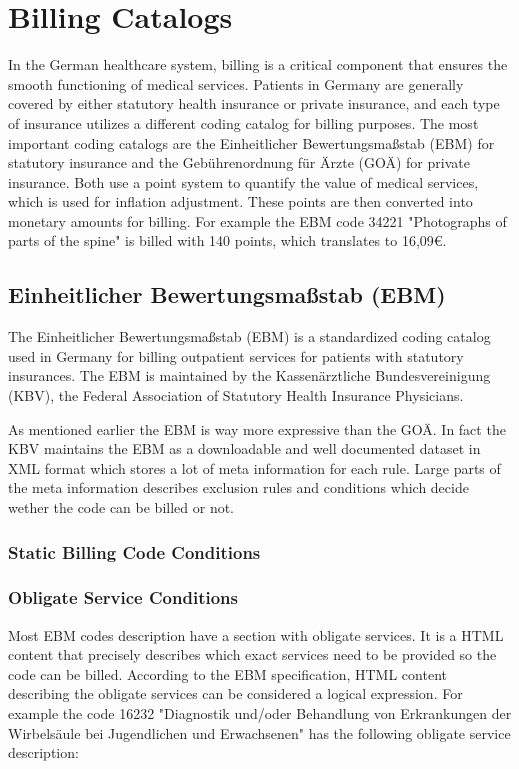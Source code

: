 \section{Billing Catalogs}
In the German healthcare system, billing is a critical component that ensures the smooth functioning of medical services.
Patients in Germany are generally covered by either statutory health insurance or private insurance, and each type of insurance
utilizes a different coding catalog for billing purposes.
The most important coding catalogs are the Einheitlicher Bewertungsmaßstab (EBM) for statutory insurance and the Gebührenordnung für Ärzte (GOÄ) for private insurance.
Both use a point system to quantify the value of medical services, which is used for inflation adjustment.
These points are then converted into monetary amounts for billing.
For example the EBM code 34221 "Photographs of parts of the spine" is billed with 140 points, which translates to 16,09€.



\subsection{Einheitlicher Bewertungsmaßstab (EBM)}
The Einheitlicher Bewertungsmaßstab (EBM) is a standardized coding catalog used in Germany for billing outpatient services for patients with statutory insurances.
The EBM is maintained by the Kassenärztliche Bundesvereinigung (KBV), the Federal Association of Statutory Health Insurance Physicians.

As mentioned earlier the EBM is way more expressive than the GOÄ.
In fact the KBV maintains the EBM as a downloadable and well documented dataset in XML format which stores a lot of meta information for each rule.
Large parts of the meta information describes exclusion rules and conditions which decide wether the code can be billed or not.

\subsubsection{Static Billing Code Conditions}


\subsubsection{Obligate Service Conditions}
Most EBM codes description have a section with obligate services.
It is a HTML content that precisely describes which exact services need to be provided so the code can be billed.
According to the EBM specification, HTML content describing the obligate services can be considered a logical expression.
For example the code 16232 "Diagnostik und/oder Behandlung von Erkrankungen der Wirbelsäule bei Jugendlichen und Erwachsenen" has the following obligate service description:


